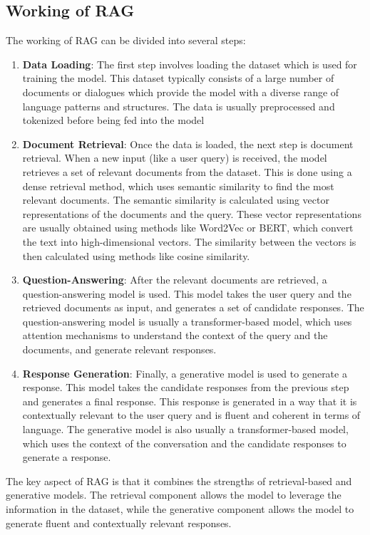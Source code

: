 \subsection{Working of RAG}
The working of RAG can be divided into several steps:
\begin{enumerate}
  \item \textbf{Data Loading}: The first step involves loading the dataset which is used for training the model. This dataset typically consists of a large number of documents or dialogues which provide the model with a diverse range of language patterns and structures. The data is usually preprocessed and tokenized before being fed into the model
  \item \textbf{Document Retrieval}: Once the data is loaded, the next step is document retrieval. When a new input (like a user query) is received, the model retrieves a set of relevant documents from the dataset. This is done using a dense retrieval method, which uses semantic similarity to find the most relevant documents. The semantic similarity is calculated using vector representations of the documents and the query. These vector representations are usually obtained using methods like Word2Vec or BERT, which convert the text into high-dimensional vectors. The similarity between the vectors is then calculated using methods like cosine similarity.
  \item \textbf{Question-Answering}: After the relevant documents are retrieved, a question-answering model is used. This model takes the user query and the retrieved documents as input, and generates a set of candidate responses. The question-answering model is usually a transformer-based model, which uses attention mechanisms to understand the context of the query and the documents, and generate relevant responses.
  \item \textbf{Response Generation}: Finally, a generative model is used to generate a response. This model takes the candidate responses from the previous step and generates a final response. This response is generated in a way that it is contextually relevant to the user query and is fluent and coherent in terms of language. The generative model is also usually a transformer-based model, which uses the context of the conversation and the candidate responses to generate a response.
\end{enumerate}
The key aspect of RAG is that it combines the strengths of retrieval-based and generative models. The retrieval component allows the model to leverage the information in the dataset, while the generative component allows the model to generate fluent and contextually relevant responses.
